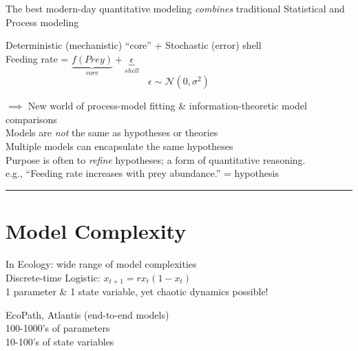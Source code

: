 \documentclass{article}
\begin{document}
The best modern-day quantitative modeling \textit{combines} traditional Statistical and Process modeling
\begin{center}
		Deterministic (mechanistic) ``core'' + Stochastic (error) shell\\
		Feeding rate = $\underbrace{f(Prey)}_{core} + \underbrace{\epsilon}_{shell}$
		\begin{equation*}
			\epsilon  \sim \mathcal{N}(0, \sigma^2)
		\end{equation*}
\end{center}

$\implies$ New world of process-model fitting \& information-theoretic model comparisons\\

Models are \textit{not} the same as hypotheses or theories\\
Multiple models can encapsulate the same hypotheses\\
Purpose is often to \textit{refine} hypotheses; a form of quantitative reasoning.\\

e.g., ``Feeding rate increases with prey abundance.'' = hypothesis

\rule[0.5ex]{\linewidth}{1pt}

\pagebreak

\section*{Model Complexity}

In Ecology: wide range of model complexities\\

\-\hspace{1cm} Discrete-time Logistic: $x_{t+1} = r x_t(1-x_t)$ \\
\-\hspace{1cm} \-\hspace{1cm}  1 parameter \& 1 state variable, yet chaotic dynamics possible!

\-\hspace{1cm} EcoPath, Atlantis (end-to-end models)\\
\-\hspace{1cm} \-\hspace{1cm} 100-1000's of parameters\\
\-\hspace{1cm} \-\hspace{1cm} 10-100's of state variables\\
\end{document}
